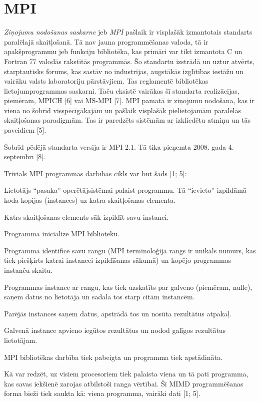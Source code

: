 \section{MPI}
\emph{Ziņojumu nodošanas saskarne} jeb \emph{MPI}  pašlaik ir
visplašāk izmantotais standarts paralēlajā skaitļošanā. Tā nav jauna programmēšanas valoda,
tā ir apakšprogrammu jeb funkciju bibliotēka, kas primāri var tikt izmantota C un Fortran 77
valodās rakstītās programmās. Šo standartu izstrādā un uztur atvērts, starptautisks forums,
kas sastāv no industrijas, augstākās izglītības iestāžu un vairāku valsts laboratoriju pārstāvjiem.
Tas reglamentē bibliotēkas lietojumprogrammas saskarni. Taču eksistē vairākas šī standarta
realizācijas, piemēram, MPICH [6] vai MS-MPI [7]. MPI pamatā ir ziņojumu nodošana, kas ir
viena no šobrīd visspēcīgākajām un pašlaik visplašāk pielietojamām paralēlās skaitļošanas
paradigmām. Tas ir paredzēts sistēmām ar izkliedētu atmiņu un tās paveidiem [5].

Šobrīd pēdējā standarta versija ir MPI 2.1. Tā tika pieņemta 2008. gada 4. septembrī [8].

Triviāls MPI programmas darbības cikls var būt šāds [1; 5]:
\begin{numlist}
	\item Lietotājs “pasaka” operētājsistēmai palaist programmu. Tā “ievieto” izpildāmā koda
		kopijas (instances) uz katra skaitļošanas elementa.
	\item Katrs skaitļošanas elements sāk izpildīt savu instanci.
	\item Programma inicializē MPI bibliotēku.
	\item Programma identificē savu rangu (MPI terminoloģijā rangs ir unikāls numurs, kas
		tiek piešķirts katrai instancei izpildīšanas sākumā) un kopējo programmas instanču skaitu.
	\item Programmas instance ar rangu, kas tiek uzskatīts par galveno (piemēram, nulle),
		saņem datus no lietotāja un sadala tos starp citām instancēm.
	\item Parējās instances saņem datus, apstrādā tos un nosūta rezultātus atpakaļ.
	\item Galvenā instance apvieno iegūtos rezultātus un nodod galīgos rezultātus lietotājam.
	\item MPI bibliotēkas darbība tiek pabeigta un programma tiek apstādināta.
\end{numlist}

Kā var redzēt, uz visiem procesoriem tiek palaista viena un tā pati programma, kas savas
iekšienē zarojas atbilstoši ranga vērtībai. Šī MIMD programmēšanas forma bieži tiek saukta
kā: viena programma, vairāki dati  [1; 5].

